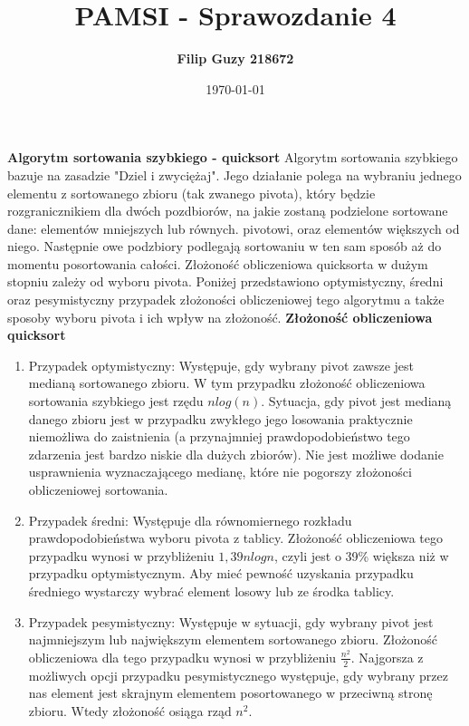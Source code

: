 \documentclass[10pt, a4paper]{article}
\date{\today}
\title{\textbf{PAMSI - Sprawozdanie 4}}
\author{\textbf{Filip Guzy 218672}}
\begin{document}
\maketitle

\begin{flushleft}
\textbf{Algorytm sortowania szybkiego - quicksort} \newline \newline
Algorytm sortowania szybkiego bazuje na zasadzie "Dziel i zwyciężaj". Jego działanie polega na wybraniu jednego elementu z sortowanego zbioru (tak zwanego pivota), który będzie rozgranicznikiem dla dwóch pozdbiorów, na jakie zostaną podzielone sortowane dane: elementów mniejszych lub równych. pivotowi, oraz elementów większych od niego. Następnie owe podzbiory podlegają sortowaniu w ten sam sposób aż do momentu posortowania całości. Złożoność obliczeniowa quicksorta w dużym stopniu zależy od wyboru pivota. Poniżej przedstawiono optymistyczny, średni oraz pesymistyczny przypadek złożoności obliczeniowej tego algorytmu a także sposoby wyboru pivota i ich wpływ na złożoność.\newline \newline
\textbf{Złożoność obliczeniowa quicksort}
\begin{enumerate}
\item Przypadek optymistyczny: \newline
Występuje, gdy wybrany pivot zawsze jest medianą sortowanego zbioru. W tym przypadku złożoność obliczeniowa sortowania szybkiego jest rzędu $nlog(n)$. Sytuacja, gdy pivot jest medianą danego zbioru jest w przypadku zwykłego jego losowania praktycznie niemożliwa do zaistnienia (a przynajmniej prawdopodobieństwo tego zdarzenia jest bardzo niskie dla dużych zbiorów). Nie jest możliwe dodanie usprawnienia wyznaczającego medianę, które nie pogorszy złożoności obliczeniowej sortowania.
\item Przypadek średni: \newline
Występuje dla równomiernego rozkładu prawdopodobieństwa wyboru pivota z tablicy. Złożoność obliczeniowa tego przypadku wynosi w przybliżeniu $1,39nlogn$, czyli jest o 39\% większa niż w przypadku optymistycznym. Aby mieć pewność uzyskania przypadku średniego wystarczy wybrać element losowy lub ze środka tablicy.\newline
\item Przypadek pesymistyczny: \newline
Występuje w sytuacji, gdy wybrany pivot jest najmniejszym lub największym elementem sortowanego zbioru. Złożoność obliczeniowa dla tego przypadku wynosi w przybliżeniu $\frac{n^2}{2}$. Najgorsza z możliwych opcji przypadku pesymistycznego występuje, gdy wybrany przez nas element jest skrajnym elementem posortowanego w przeciwną stronę zbioru. Wtedy złożoność osiąga rząd $n^2$.
\end{enumerate}


\end{flushleft}
\end{document}
